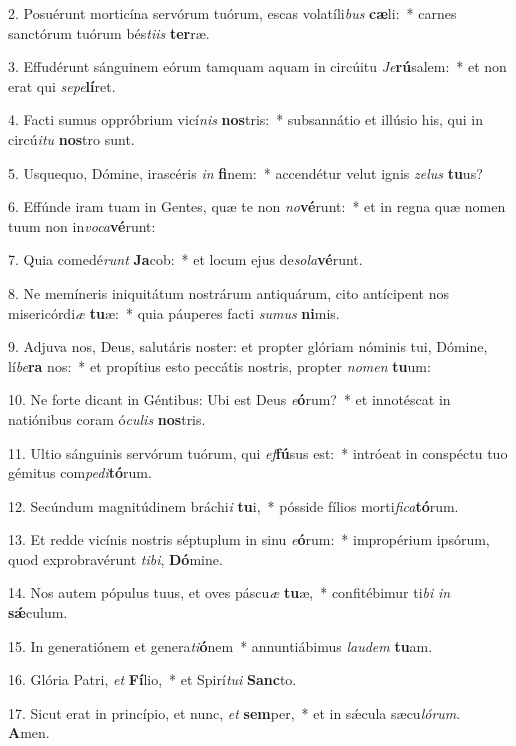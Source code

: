 2. Posuérunt morticína servórum tuórum, escas volatíli\textit{bus} \textbf{cæ}li:~*  carnes sanctórum tuórum bés\textit{ti}\textit{is} \textbf{ter}ræ.\

3. Effudérunt sánguinem eórum tamquam aquam in circúitu \textit{Je}\textbf{rú}salem:~*  et non erat qui \textit{se}\textit{pe}\textbf{lí}ret.\

4. Facti sumus oppróbrium vicí\textit{nis} \textbf{nos}tris:~*  subsannátio et illúsio his, qui in circú\textit{i}\textit{tu} \textbf{nos}tro sunt.\

5. Usquequo, Dómine, irascéris \textit{in} \textbf{fi}nem:~*  accendétur velut ignis \textit{ze}\textit{lus} \textbf{tu}us?\

6. Effúnde iram tuam in Gentes, quæ te non \textit{no}\textbf{vé}runt:~*  et in regna quæ nomen tuum non in\textit{vo}\textit{ca}\textbf{vé}runt:\

7. Quia comedé\textit{runt} \textbf{Ja}cob:~*  et locum ejus de\textit{so}\textit{la}\textbf{vé}runt.\

8. Ne memíneris iniquitátum nostrárum antiquárum, cito antícipent nos misericórdi\textit{æ} \textbf{tu}æ:~*  quia páuperes facti \textit{su}\textit{mus} \textbf{ni}mis.\

9. Adjuva nos, Deus, salutáris noster: et propter glóriam nóminis tui, Dómine, lí\textit{be}\textbf{ra} nos:~*  et propítius esto peccátis nostris, propter \textit{no}\textit{men} \textbf{tu}um:\

10. Ne forte dicant in Géntibus: Ubi est Deus \textit{e}\textbf{ó}rum?~*  et innotéscat in natiónibus coram ó\textit{cu}\textit{lis} \textbf{nos}tris.\

11. Ultio sánguinis servórum tuórum, qui \textit{ef}\textbf{fú}sus est:~*  intróeat in conspéctu tuo gémitus com\textit{pe}\textit{di}\textbf{tó}rum.\

12. Secúndum magnitúdinem bráchi\textit{i} \textbf{tu}i,~*  pósside fílios morti\textit{fi}\textit{ca}\textbf{tó}rum.\

13. Et redde vicínis nostris séptuplum in sinu \textit{e}\textbf{ó}rum:~*  impropérium ipsórum, quod exprobravérunt \textit{ti}\textit{bi}, \textbf{Dó}mine.\

14. Nos autem pópulus tuus, et oves páscu\textit{æ} \textbf{tu}æ,~*  confitébimur ti\textit{bi} \textit{in} \textbf{sǽ}culum.\

15. In generatiónem et genera\textit{ti}\textbf{ó}nem~*  annuntiábimus \textit{lau}\textit{dem} \textbf{tu}am.\

16. Glória Patri, \textit{et} \textbf{Fí}lio,~*  et Spirí\textit{tu}\textit{i} \textbf{Sanc}to.\

17. Sicut erat in princípio, et nunc, \textit{et} \textbf{sem}per,~*  et in sǽcula sæcu\textit{ló}\textit{rum}. \textbf{A}men.\

